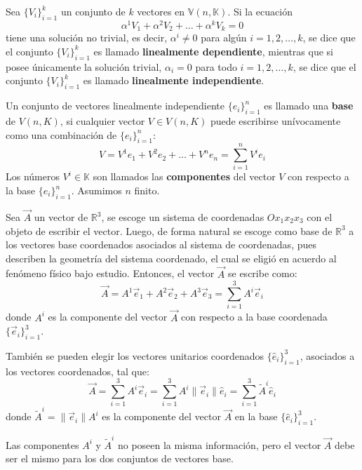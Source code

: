 \documentclass[../apunte_mecanica_clasica.tex]{subfiles}%
\begin{document}
Sea $\{V_i\}_{i=1}^{k}$ un conjunto de $k$ vectores en $\mathbb{V}(n, \mathbb{K})$. Si la ecuación
\begin{equation*}
\alpha^1 V_1 + \alpha^2 V_2 + \dots + \alpha^k V_k = 0
\end{equation*}
tiene una solución no trivial, es decir, $\alpha^i \neq 0$ para algún $i = 1,2,\dots,k$, se dice que el conjunto $\{V_i\}_{i=1}^{k}$ es llamado \textbf{linealmente dependiente}, mientras que si posee únicamente la solución trivial, $\alpha_i = 0$ para todo $i = 1,2,\dots,k$, se dice que el conjunto $\{V_i\}_{i=1}^{k}$ es llamado \textbf{linealmente independiente}.

Un conjunto de vectores linealmente independiente $\{e_i\}_{i=1}^{n}$ es llamado una \textbf{base} de $V(n,K)$, si cualquier vector $V \in V(n,K)$ puede escribirse unívocamente como una combinación de $\{e_i\}_{i=1}^{n}$:
\begin{equation*}
V = V^1 e_1 + V^2 e_2 + \dots + V^n e_n = \sum_{i=1}^{n} V^i e_i
\end{equation*}
Los números $V^i \in \mathbb{K}$ son llamados las \textbf{componentes} del vector $V$ con respecto a la base $\{e_i\}_{i=1}^{n}$. Asumimos $n$ finito.

Sea $\vec{A}$ un vector de $\mathbb{R}^3$, se escoge un sistema de coordenadas $Ox_1x_2x_3$ con el objeto de escribir el vector. Luego, de forma natural se escoge como base de $\mathbb{R}^3$ a los vectores base coordenados asociados al sistema de coordenadas, pues describen la geometría del sistema coordenado, el cual se eligió en acuerdo al fenómeno físico bajo estudio. Entonces, el vector $\vec{A}$ se escribe como:
\begin{equation*}
\vec{A} = A^1 \vec{e}_1 + A^2 \vec{e}_2 + A^3 \vec{e}_3 = \sum_{i=1}^{3} A^i \vec{e}_i
\end{equation*}
donde $A^i$ es la componente del vector $\vec{A}$ con respecto a la base coordenada $\{\vec{e}_i\}_{i=1}^{3}$.

También se pueden elegir los vectores unitarios coordenados $\{\hat{e}_i\}_{i=1}^{3}$, asociados a los vectores coordenados, tal que:
\begin{equation*}
\vec{A} = \sum_{i=1}^{3} A^i \vec{e}_i = \sum_{i=1}^{3} A^i \|\vec{e}_i\| \hat{e}_i = \sum_{i=1}^{3} \tilde{A}^i \hat{e}_i
\end{equation*}
donde $\tilde{A}^i = \|\vec{e}_i\| A^i$ es la componente del vector $\vec{A}$ en la base $\{\hat{e}_i\}_{i=1}^{3}$.

Las componentes $A^i$ y $\tilde{A}^i$ no poseen la misma información, pero el vector $\vec{A}$ debe ser el mismo para los dos conjuntos de vectores base.
\end{document}
